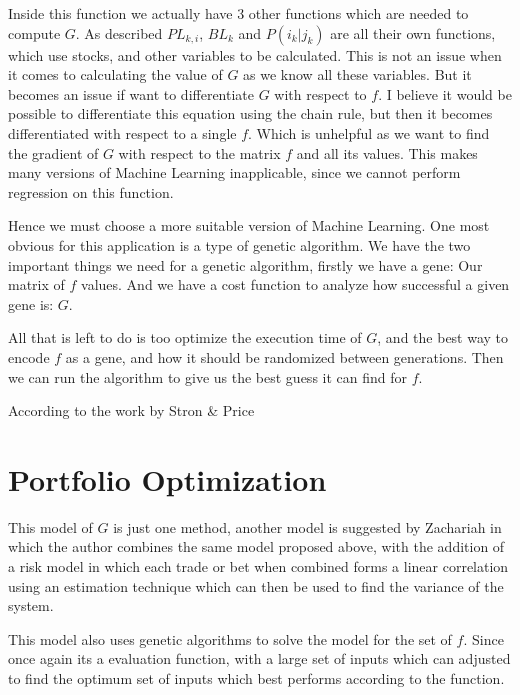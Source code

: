 \documentclass[12pt]{article}
\begin{document}
    Inside this function we actually have 3 other functions which are needed to compute \(G\).
    As described \(PL_{k,i}\), \(BL_k\) and \(P(i_k | j_k)\) are all their own functions, which
    use stocks, and other variables to be calculated. This is not an issue when it comes to
    calculating the value of \(G\) as we know all these variables. But it becomes an issue if
    want to differentiate \(G\) with respect to \(f\). I believe it would be possible to
    differentiate this equation using the chain rule, but then it becomes differentiated with
    respect to a single \(f\). Which is unhelpful as we want to find the gradient of \(G\)
    with respect to the matrix \(f\) and all its values. This makes many versions of Machine
    Learning inapplicable, since we cannot perform regression on this function.

    Hence we must choose a more suitable version of Machine Learning. One most obvious 
    for this application is a type of genetic algorithm. We have the two important things
    we need for a genetic algorithm, firstly we have a gene: Our matrix of \(f\) values.
    And we have a cost function to analyze how successful a given gene is: \(G\).

    All that is left to do is too optimize the execution time of \(G\), and the best way to
    encode \(f\) as a gene, and how it should be randomized between generations.
    Then we can run the algorithm to give us the best guess it can find for \(f\).

    According to the work by Stron \& Price \cite{Storn-Price}

\section{Portfolio Optimization}

    This model of \(G\) is just one method, another model is suggested by Zachariah
    \cite{Zachariah} in which the author combines the same model proposed above, with the 
    addition of a risk model in which each trade or bet when combined forms a linear correlation 
    using an estimation technique which can then be used to find the variance of the system.

    This model also uses genetic algorithms to solve the model for the set of \(f\). 
    Since once again its a evaluation function, 
    with a large set of inputs which can adjusted to find the optimum set of inputs which best 
    performs according to the function.
\end{document}
